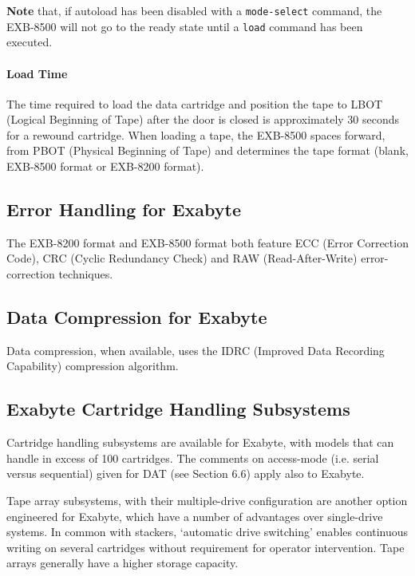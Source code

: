 {\bf Note} that, if autoload has been disabled with a {\tt mode-select}
command, the EXB-8500 will not go to the ready state until a {\tt load} command
has been executed.

\paragraph {Load Time}

The time required to load the data cartridge and position the tape to LBOT
(Logical Beginning of Tape) after the door is closed is approximately 30
seconds for a rewound cartridge.  When loading a tape, the EXB-8500 spaces
forward, from PBOT (Physical Beginning of Tape) and determines the tape
format (blank, EXB-8500 format or EXB-8200 format).

\subsection {Error Handling for Exabyte}

The EXB-8200 format and EXB-8500 format both feature ECC (Error Correction
Code), CRC (Cyclic Redundancy Check) and RAW (Read-After-Write)
error-correction techniques.

\subsection {Data Compression for Exabyte}

Data compression, when available, uses the IDRC (Improved Data Recording
Capability) compression algorithm.

\subsection {Exabyte Cartridge Handling Subsystems}

Cartridge handling subsystems are available for Exabyte, with models that
can handle in excess of 100 cartridges. The comments on access-mode (i.e.
serial versus sequential) given for DAT (see Section 6.6) apply also to Exabyte.

Tape array subsystems, with their multiple-drive configuration are another
option engineered for Exabyte, which have a number of advantages over
single-drive systems. In common with stackers, `automatic drive switching'
enables continuous writing on several cartridges without requirement for
operator intervention. Tape arrays generally have a higher storage capacity.

